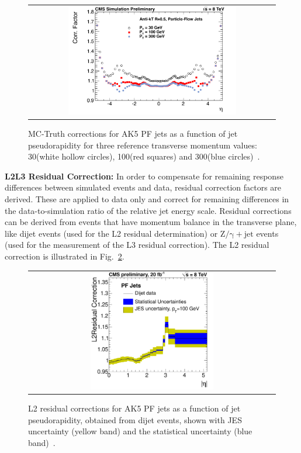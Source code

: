 \begin{description}
\begin{figure}[!h]
  \centering 
  \begin{tabular}{c}
    \includegraphics[width=0.7\textwidth]{figures/CorrectionVsEta_Overview_TDR_ak5pfl1_L2L3.pdf} 
  \end{tabular}
  \caption{MC-Truth corrections for AK5 PF jets as a function of jet pseudorapidity for three reference transverse momentum values: 30\gev (white hollow circles), 100\gev (red squares) and 300\gev (blue circles)~\cite{CMS-DP-2013-033}.}
  \label{fig:l2l3}
\end{figure}
 \item \textbf{L2L3 Residual Correction:} In order to compensate for remaining response differences between simulated events and data, residual correction factors are derived. These are applied to data only and correct for remaining differences in the data-to-simulation ratio of the relative jet energy scale. Residual corrections can be derived from events that have momentum balance in the transverse plane, like dijet events (used for the L2 residual determination) or $\mathrm{Z/\gamma+jet}$ events (used for the measurement of the L3 residual correction). The L2 residual correction is illustrated in Fig.~\ref{fig:l2res}.
\begin{figure}[!h]
  \centering 
  \begin{tabular}{c}
    \includegraphics[width=0.51\textwidth]{figures/ResComp_FSRcorr_residuals_Abseta_PF_DiJetData.pdf} 
  \end{tabular}
  \caption{L2 residual corrections for AK5 PF jets as a function of jet pseudorapidity, obtained from dijet events, shown with JES uncertainty (yellow band) and the statistical uncertainty (blue band)~\cite{CMS-DP-2013-033}.}
  \label{fig:l2res}
\end{figure}

\end{description}

